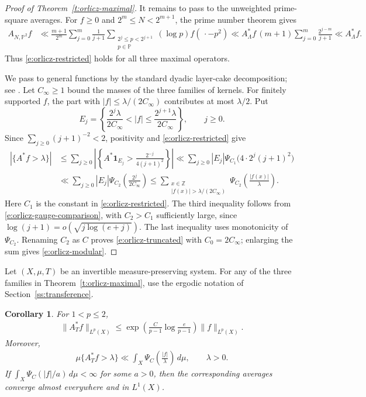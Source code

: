 \documentclass[12pt,reqno]{amsart}
\numberwithin{equation}{section}
\newtheorem{corollary}[equation]{Corollary}
\theoremstyle{definition}
\theoremstyle{remark}
\begin{document}
\begin{proof}[Proof of Theorem~\ref{t:orlicz-maximal}]
It remains to pass to the unweighted prime-square averages.  For
\(f\geq0\) and \(2^m\leq N<2^{m+1}\), the prime number theorem gives
\begin{align*}
 A_{N,\mathbb P^2}f
 &\ll
 \frac{m+1}{2^m}
 \sum_{j=0}^m\frac1{j+1}
 \sum_{\substack{2^j\leq p<2^{j+1}\\p\in\mathbb P}}
 (\log p)f(\,\cdot-p^2)\ll
 A_\Lambda^*f\,
 (m+1)\sum_{j=0}^m\frac{2^{j-m}}{j+1}
 \ll A_\Lambda^*f.
\end{align*}
Thus \eqref{e:orlicz-restricted} holds for all three maximal
operators.

We pass to general functions by the standard dyadic layer-cake
decomposition; see \cite[Chapter~1, \S2]{BB}.
Let \(C_\infty\geq1\) bound the masses of the three families of
kernels.  For finitely supported \(f\), the part with
\(|f|\leq\lambda/(2C_\infty)\) contributes at most \(\lambda/2\).
Put
\[
 E_j=
 \left\{
 \frac{2^j\lambda}{2C_\infty}<|f|
 \leq\frac{2^{j+1}\lambda}{2C_\infty}
 \right\},
 \qquad j\geq0.
\]
Since \(\sum_{j\geq0}(j+1)^{-2}<2\), positivity and
\eqref{e:orlicz-restricted} give
\begin{align*}
 |\{A^*f>\lambda\}|
 &\leq
 \sum_{j\geq0}
 \left|\left\{
 A^*\mathbf1_{E_j}>
 \frac{2^{-j}}{4(j+1)^2}
 \right\}\right|\ll
 \sum_{j\geq0}|E_j|
 \Psi_{C_1}\bigl(4\cdot2^j(j+1)^2\bigr)\\
 &\ll
 \sum_{j\geq0}|E_j|
 \Psi_{C_2}\left(\frac{2^j}{2C_\infty}\right)\leq
 \sum_{\substack{x\in\mathbb Z\\
 |f(x)|>\lambda/(2C_\infty)}}
 \Psi_{C_2}\left(\frac{|f(x)|}{\lambda}\right).
\end{align*}
Here \(C_1\) is the constant in \eqref{e:orlicz-restricted}.
The third inequality follows from
\eqref{e:orlicz-gauge-comparison}, with \(C_2>C_1\)
sufficiently large, since
\(\log(j+1)=o(\sqrt{j\log(e+j)})\).
The last inequality uses monotonicity of \(\Psi_{C_2}\).
Renaming \(C_2\) as \(C\) proves
\eqref{e:orlicz-truncated} with \(C_0=2C_\infty\);
enlarging the sum gives \eqref{e:orlicz-modular}.
\end{proof}



Let \((X,\mu,T)\) be an invertible measure-preserving system.
For any of the three families in Theorem~\ref{t:orlicz-maximal},
use the ergodic notation of Section~\ref{ss:transference}.

\begin{corollary}\label{c:orlicz-ergodic}
For \(1<p\leq2\),
\begin{align}\label{e:orlicz-ergodic-lp}
 \|A_T^*f\|_{L^p(X)}
 \leq
 \exp\left(
 \frac{C}{p-1}\log\frac{e}{p-1}
 \right)\|f\|_{L^p(X)}.
\end{align}
Moreover,
\begin{align}\label{e:orlicz-ergodic}
 \mu\{A_T^*f>\lambda\}
 \ll
 \int_X\Psi_C\left(\frac{|f|}{\lambda}\right)\,d\mu,
 \qquad \lambda>0.
\end{align}
If $ \int_X\Psi_C(|f|/a)\,d\mu<\infty$
for some \(a>0\), then the corresponding averages converge almost
everywhere and in \(L^1(X)\).
\end{corollary}
\end{document}
